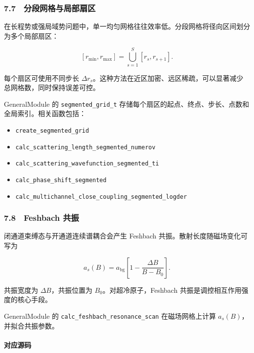 \documentclass[
]{ctexbook}
\providecommand{\tightlist}{%
  \setlength{\itemsep}{0pt}\setlength{\parskip}{0pt}}
\begin{document}
\hypertarget{ux5206ux6bb5ux7f51ux683cux4e0eux5c40ux90e8ux6247ux533a}{%
\subsubsection{7.7　分段网格与局部扇区}\label{ux5206ux6bb5ux7f51ux683cux4e0eux5c40ux90e8ux6247ux533a}}

在长程势或强局域势问题中，单一均匀网格往往效率低。分段网格将径向区间划分为多个局部扇区：

\[
[r_{\min},r_{\max}]
=
\bigcup_{s=1}^{S}
[r_s,r_{s+1}].
\]

每个扇区可使用不同步长
\(\Delta r_s\)。这种方法在近区加密、远区稀疏，可以显著减少总网格数，同时保持误差可控。

GeneralModule 的 \texttt{segmented\_grid\_t}
存储每个扇区的起点、终点、步长、点数和全局索引。相关函数包括：

\begin{itemize}
\tightlist
\item
  \texttt{create\_segmented\_grid}
\item
  \texttt{calc\_scattering\_length\_segmented\_numerov}
\item
  \texttt{calc\_scattering\_wavefunction\_segmented\_ti}
\item
  \texttt{calc\_phase\_shift\_segmented}
\item
  \texttt{calc\_multichannel\_close\_coupling\_segmented\_logder}
\end{itemize}

\hypertarget{feshbach-ux5171ux632f}{%
\subsubsection{7.8　Feshbach 共振}\label{feshbach-ux5171ux632f}}

闭通道束缚态与开通道连续谱耦合会产生 Feshbach
共振。散射长度随磁场变化可写为

\[
a_s(B)
=
a_{\mathrm{bg}}
\left[
1-\frac{\Delta B}{B-B_0}
\right].
\]

共振宽度为 \(\Delta B\)，共振位置为 \(B_0\)。对超冷原子，Feshbach
共振是调控相互作用强度的核心手段。

GeneralModule 的 \texttt{calc\_feshbach\_resonance\_scan}
在磁场网格上计算 \(a_s(B)\)，并拟合共振参数。

\hypertarget{ux5bf9ux5e94ux6e90ux7801-30}{%
\paragraph{对应源码}\label{ux5bf9ux5e94ux6e90ux7801-30}}
\end{document}
